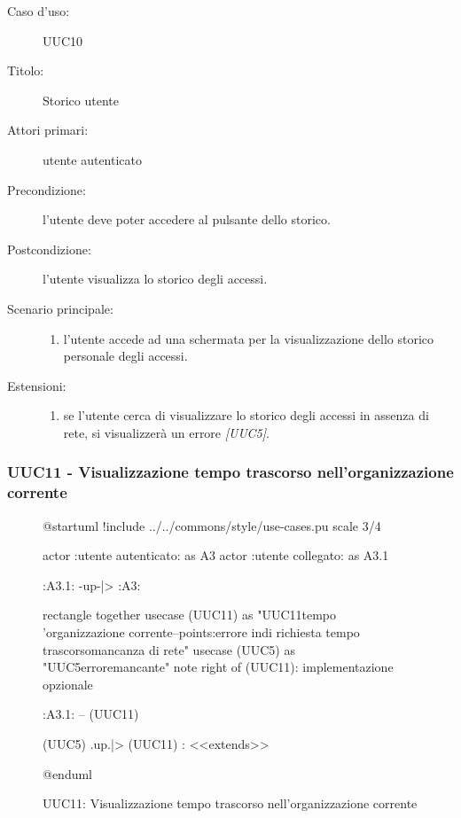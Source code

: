 \documentclass[../analisi-dei-requisiti.tex]{subfiles}
\begin{document}
\begin{description}
  \item[Caso d’uso:] UUC10
  \item[Titolo:] Storico utente
  \item[Attori primari:] utente autenticato
  \item[Precondizione:]  l'utente deve poter accedere al pulsante dello storico.
  \item[Postcondizione:] l'utente visualizza lo storico degli accessi.
  \item[Scenario principale:]
        \begin{enumerate}
          \item l'utente accede ad una schermata per la visualizzazione dello storico personale degli accessi.
        \end{enumerate}
  \item[Estensioni:]
        \begin{enumerate}
          \item se l'utente cerca di visualizzare lo storico degli accessi in assenza di rete, si visualizzerà un errore \emph{[UUC5]}.
        \end{enumerate}
\end{description}

\subsubsection{UUC11 - Visualizzazione tempo trascorso nell'organizzazione corrente}%
\label{subsub:UUC11utente}

\begin{figure}[h!]
  \centering
  \begin{plantuml}
  @startuml
  !include ../../commons/style/use-cases.pu
  scale 3/4

  actor :utente autenticato: as A3
  actor :utente collegato: as A3.1

  :A3.1: -up-|> :A3:

  rectangle {
    together {
      usecase (UUC11) as "UUC11\nVisualizzazione tempo \nnell'organizzazione corrente\n--\nExtension points:\nVisualizzazione errore in\ncaso di richiesta tempo trascorso\nin mancanza di rete"
      usecase (UUC5) as "UUC5\nVisualizzazione errore\nrete mancante"
      note right of (UUC11): implementazione opzionale
    }
  }

  :A3.1: -- (UUC11)

  (UUC5) .up.|> (UUC11) : <<extends>>

  @enduml
  \end{plantuml}
  \caption{UUC11: Visualizzazione tempo trascorso nell'organizzazione corrente}
  \label{fig:uuc11}
\end{figure}
\end{document}

